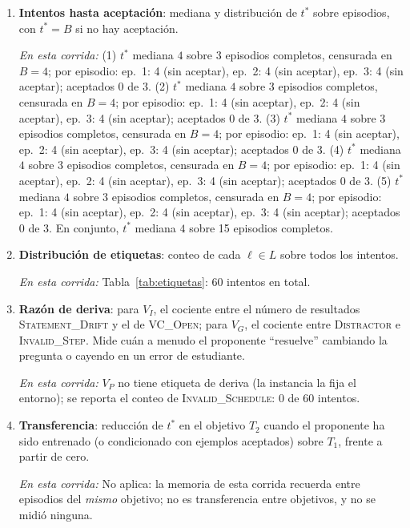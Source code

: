 \documentclass[11pt,a4paper]{article}
\begin{document}
\begin{enumerate}

  \item \textbf{Intentos hasta aceptación}: mediana y distribución de $t^*$ sobre episodios, con $t^* = B$ si no hay aceptación.

  \emph{En esta corrida:} (1) $t^*$ mediana $4$ sobre 3 episodios completos, censurada en $B = 4$; por episodio: ep.~1: 4 (sin aceptar), ep.~2: 4 (sin aceptar), ep.~3: 4 (sin aceptar); aceptados 0 de 3. (2) $t^*$ mediana $4$ sobre 3 episodios completos, censurada en $B = 4$; por episodio: ep.~1: 4 (sin aceptar), ep.~2: 4 (sin aceptar), ep.~3: 4 (sin aceptar); aceptados 0 de 3. (3) $t^*$ mediana $4$ sobre 3 episodios completos, censurada en $B = 4$; por episodio: ep.~1: 4 (sin aceptar), ep.~2: 4 (sin aceptar), ep.~3: 4 (sin aceptar); aceptados 0 de 3. (4) $t^*$ mediana $4$ sobre 3 episodios completos, censurada en $B = 4$; por episodio: ep.~1: 4 (sin aceptar), ep.~2: 4 (sin aceptar), ep.~3: 4 (sin aceptar); aceptados 0 de 3. (5) $t^*$ mediana $4$ sobre 3 episodios completos, censurada en $B = 4$; por episodio: ep.~1: 4 (sin aceptar), ep.~2: 4 (sin aceptar), ep.~3: 4 (sin aceptar); aceptados 0 de 3. En conjunto, $t^*$ mediana $4$ sobre 15 episodios completos.

  \item \textbf{Distribución de etiquetas}: conteo de cada $\ell \in L$ sobre todos los intentos.

  \emph{En esta corrida:} Tabla~\ref{tab:etiquetas}: 60 intentos en total.

  \item \textbf{Razón de deriva}: para $V_I$, el cociente entre el número de resultados \textsc{Statement\_Drift} y el de \textsc{VC\_Open}; para $V_G$, el cociente entre \textsc{Distractor} e \textsc{Invalid\_Step}. Mide cuán a menudo el proponente ``resuelve'' cambiando la pregunta o cayendo en un error de estudiante.

  \emph{En esta corrida:} $V_P$ no tiene etiqueta de deriva (la instancia la fija el entorno); se reporta el conteo de \textsc{Invalid\_Schedule}: 0 de 60 intentos.

  \item \textbf{Transferencia}: reducción de $t^*$ en el objetivo $T_2$ cuando el proponente ha sido entrenado (o condicionado con ejemplos aceptados) sobre $T_1$, frente a partir de cero.

  \emph{En esta corrida:} No aplica: la memoria de esta corrida recuerda entre episodios del \emph{mismo} objetivo; no es transferencia entre objetivos, y no se midió ninguna.


\end{enumerate}
\end{document}
